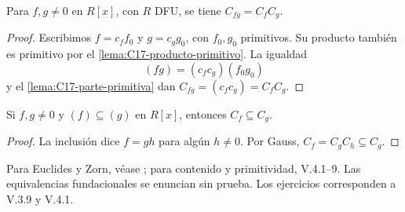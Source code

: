 \begin{prop}\label{prop:C17-Gauss}
Para $f,g\ne0$ en $R[x]$, con $R$ DFU, se tiene $C_{fg}=C_fC_g$.
\end{prop}
\begin{proof}
Escribimos $f=c_ff_0$ y $g=c_gg_0$, con $f_0,g_0$ primitivos. Su producto también es primitivo por el \cref{lema:C17-producto-primitivo}. La igualdad
\[
(fg)=(c_fc_g)(f_0g_0)
\]
y el \cref{lema:C17-parte-primitiva} dan $C_{fg}=(c_fc_g)=C_fC_g$.
\end{proof}
\begin{coro}\label{coro:C17-contenido-inclusion}
Si $f,g\ne0$ y $(f)\subseteq(g)$ en $R[x]$, entonces $C_f\subseteq C_g$.
\end{coro}
\begin{proof}
La inclusión dice $f=gh$ para algún $h\ne0$. Por Gauss, $C_f=C_gC_h\subseteq C_g$.
\end{proof}

\begin{obs}
Para Euclides y Zorn, véase \citet[cap.~V, 2.9--12 y 3.1/3/5]{aluffi2009}; para contenido y primitividad, V.4.1--9. Las equivalencias fundacionales se enuncian sin prueba. Los ejercicios corresponden a V.3.9 y V.4.1.
\end{obs}
